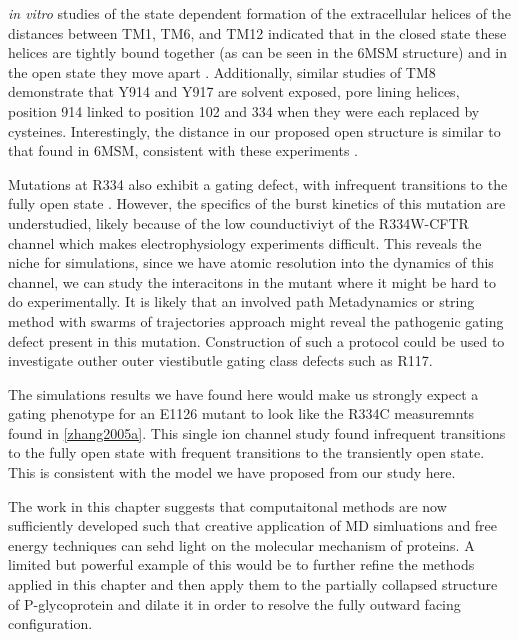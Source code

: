 \textit {in vitro} studies of the state dependent formation of the extracellular helices of the distances between  TM1, TM6, and TM12 indicated that in the closed state these helices are tightly bound together (as can be seen in the 6MSM structure) and in the open state they move apart \cite{negoda2018}. Additionally, similar studies of TM8 demonstrate that Y914 and Y917 are solvent exposed, pore lining helices, position 914 linked to position 102 and 334 when they were each replaced by cysteines. Interestingly, the distance in our proposed open structure is similar to that found in 6MSM, consistent with these experiments \cite{negoda2019}. 

Mutations at R334 also exhibit a gating defect, with infrequent transitions to the fully open state \cite{zhang2005a ,cui2013a, sheppard1993}. However, the specifics of the burst kinetics of this mutation are understudied, likely because of the low counductiviyt of the R334W-CFTR channel which makes electrophysiology experiments difficult. This reveals the niche for simulations, since we have atomic resolution into the dynamics of this channel, we can study the interacitons in the mutant where it might be hard to do experimentally. It is likely that an involved path Metadynamics or string method with swarms of trajectories approach might reveal the pathogenic gating defect present in this mutation. Construction of such a protocol could be used to investigate outher outer viestibutle gating class defects such as R117.

The simulations results we have found here would make us strongly expect a gating phenotype for an E1126 mutant to look like the R334C measuremnts found in \ref{zhang2005a}. This single ion channel study found infrequent transitions to the fully open state with frequent transitions to the transiently open state. This is consistent with the model we have proposed from our study here.

The work in this chapter suggests that computaitonal methods are now sufficiently developed such that creative application of MD simluations and free energy techniques can sehd light on the molecular mechanism of proteins. A limited but powerful example of this would be to further refine the methods applied in this chapter and then apply them to the partially collapsed structure of P-glycoprotein and dilate it in order to resolve the fully outward facing configuration.

